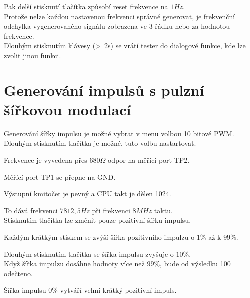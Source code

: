 Pak delší stisknutí tlačítka způsobí reset frekvence na \(1Hz\).
\\Protože nelze každou nastavenou frekvenci správně generovat, je frekvenční odchylka vygenerovaného signálu zobrazena ve 3 řádku nebo za hodnotou frekvence.
\\Dlouhým stisknutím klávesy (\textgreater~2s) se vrátí tester do dialogové funkce,
kde lze zvolit jinou funkci.

\section{Generování impulsů s pulzní šířkovou modulací}

Generování šířky impulsu je možné vybrat v menu volbou 10 bitové PWM.
\\Dlouhým stisknutím tlačítka je možné, tuto volbu nastartovat.

Frekvence je vyvedena přes \(680\Omega\) odpor na měřící port TP2.

Měřící port TP1 se přepne na GND.

Výstupní kmitočet je pevný a CPU takt je dělen 1024.

To dává frekvenci \(7812,5Hz\) při frekvenci \(8MHz\) taktu.
\\Stisknutím tlačítka  lze změnit pouze pozitivní šířku impulsu.

Každým krátkým stiskem se zvýší šířka pozitivního impulzu  o \(1\%\) až k \(99\%\).

Dlouhým stisknutím tlačítka se šířka impulsu zvyšuje o \(10\%\).
\\Když šířka impulzu dosáhne hodnoty více než \(99\%\), bude od výsledku 100 odečteno.

Šířka impulsu \(0\%\)  vytváří velmi krátký pozitivní impuls.

